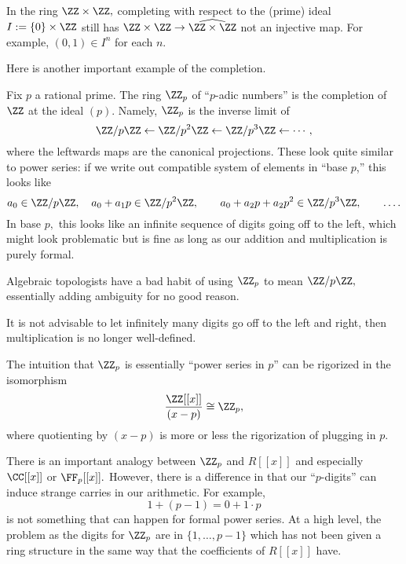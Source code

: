 \documentclass[../notes.tex]{subfiles}
\begin{document}
\begin{nex}[Miles]
	In the ring $\ZZ\times\ZZ,$ completing with respect to the (prime) ideal $I:=\{0\}\times\ZZ$ still has $\ZZ\times\ZZ\to\widehat{\ZZ\times\ZZ}$ not an injective map. For example, $(0,1)\in I^n$ for each $n.$
\end{nex}
Here is another important example of the completion.
\begin{example}
	Fix $p$ a rational prime. The ring $\ZZ_p$ of ``$p$-adic numbers'' is the completion of $\ZZ$ at the ideal $(p).$ Namely, $\ZZ_p$ is the inverse limit of
	\[\ZZ/p\ZZ\leftarrow\ZZ/p^2\ZZ\leftarrow\ZZ/p^3\ZZ\leftarrow\cdots,\]
	where the leftwards maps are the canonical projections. These look quite similar to power series: if we write out compatible system of elements in ``base $p$,'' this looks like
	\[a_0\in\ZZ/p\ZZ,\quad a_0+a_1p\in\ZZ/p^2\ZZ,\qquad a_0+a_2p+a_2p^2\in\ZZ/p^3\ZZ,\qquad\ldots.\]
	In base $p,$ this looks like an infinite sequence of digits going off to the left, which might look problematic but is fine as long as our addition and multiplication is purely formal.
\end{example}
\begin{remark}
	Algebraic topologists have a bad habit of using $\ZZ_p$ to mean $\ZZ/p\ZZ,$ essentially adding ambiguity for no good reason.
\end{remark}
\begin{remark}
	It is not advisable to let infinitely many digits go off to the left and right, then multiplication is no longer well-defined.
\end{remark}
\begin{remark}[Nir]
	The intuition that $\ZZ_p$ is essentially ``power series in $p$'' can be rigorized in the isomorphism
	\[\frac{\ZZ[[x]]}{(x-p)}\cong\ZZ_p,\]
	where quotienting by $(x-p)$ is more or less the rigorization of plugging in $p.$
\end{remark}
There is an important analogy between $\ZZ_p$ and $R[[x]]$ and especially $\CC[[x]]$ or $\FF_p[[x]].$ However, there is a difference in that our ``$p$-digits'' can induce strange carries in our arithmetic. For example,
\[1+(p-1)=0+1\cdot p\]
is not something that can happen for formal power series. At a high level, the problem as the digits for $\ZZ_p$ are in $\{1,\ldots,p-1\}$ which has not been given a ring structure in the same way that the coefficients of $R[[x]]$ have.
\end{document}
